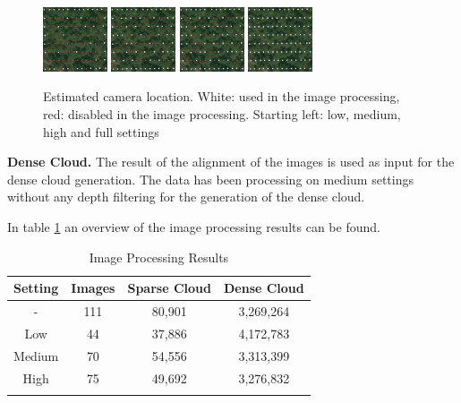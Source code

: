 \documentclass{isprs} %
\begin{document}
\begin{figure}[h]
    \centering
    \includegraphics[width=1.9cm]{loc_low.png}
    \includegraphics[width=1.9cm]{loc_med.png}
    \includegraphics[width=1.9cm]{loc_high.png}
    \includegraphics[width=1.9cm]{loc_full.png}
    \caption{Estimated camera location. 
    White: used in the image processing, red: disabled in the image processing.
    Starting left: low, medium, high and full settings}
    \label{fig:cameralocation}
\end{figure}

\textbf{Dense Cloud.}
The result of the alignment of the images is used as input for the dense cloud generation.
The data has been processing on medium  settings without any depth filtering for the generation of the dense cloud. 

In table \ref{tab:ImageProcessing} an overview of the image processing results can be found.

\begin{table}[h]
    \centering
    \caption{Image Processing Results}
    \begin{tabular}{@{}cccc@{}}
    \toprule
    \textbf{Setting} & \textbf{Images} & \multicolumn{1}{l}{\textbf{Sparse Cloud}} & \multicolumn{1}{l}{\textbf{Dense Cloud}} \\ \midrule
    -      & 111 & 80,901 & 3,269,264 \\
    Low    & 44  & 37,886 & 4,172,783 \\
    Medium & 70  & 54,556 & 3,313,399 \\
    High   & 75  & 49,692 & 3,276,832 \\ \bottomrule
    \label{tab:ImageProcessing}
\end{tabular}
\end{table}
\end{document}
